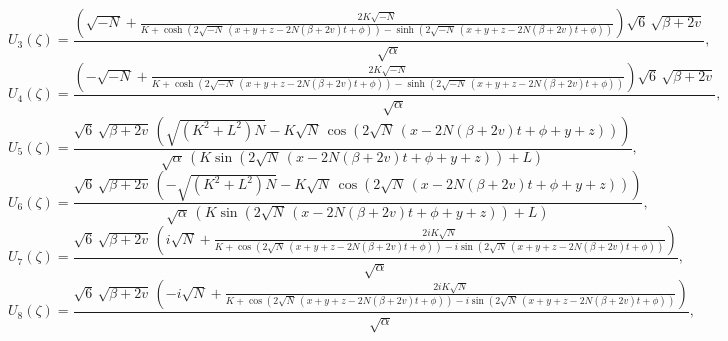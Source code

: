 \documentclass{article}
\numberwithin{equation}{section}
\begin{document}
\begin{equation}\label{U3}
    U_{3}\! \left(\zeta \right) =
\frac{\left(\sqrt{-N}+\frac{2 K \sqrt{-N}}{K +\cosh \left(2 \sqrt{-N}\, \left(x + y + z  -2 N \left(\beta +2 v \right) t +\phi \right)\right)-\sinh \left(2 \sqrt{-N}\, \left(x + y + z  -2 N \left(\beta +2 v \right) t +\phi \right)\right)}\right) \sqrt{6}\, \sqrt{\beta +2 v}}{\sqrt{\alpha}},
\end{equation}
\begin{equation}\label{U4}
    U_{4}\! \left(\zeta \right) =
\frac{\left(-\sqrt{-N}+\frac{2 K \sqrt{-N}}{K +\cosh \left(2 \sqrt{-N}\, \left(x + y + z  -2 N \left(\beta +2 v \right) t +\phi \right)\right)-\sinh \left(2 \sqrt{-N}\, \left(x + y + z  -2 N \left(\beta +2 v \right) t +\phi \right)\right)}\right) \sqrt{6}\, \sqrt{\beta +2 v}}{\sqrt{\alpha}},
\end{equation}
\begin{equation}\label{U5}
    U_{5} \! \left(\zeta \right) =
\frac{\sqrt{6}\, \sqrt{\beta +2 v}\, \left(\sqrt{\left(K^{2}+L^{2}\right) N}-K \sqrt{N}\, \cos \! \left(2 \sqrt{N}\, \left(x -2 N \left(\beta +2 v \right) t +\phi +y +z \right)\right)\right)}{\sqrt{\alpha}\, \left(K \sin \! \left(2 \sqrt{N}\, \left(x -2 N \left(\beta +2 v \right) t +\phi +y +z \right)\right)+L \right)},
\end{equation}
\begin{equation}\label{U6}
    U_{6} \! \left(\zeta \right) =
\frac{\sqrt{6}\, \sqrt{\beta +2 v}\, \left(-\sqrt{\left(K^{2}+L^{2}\right) N}-K \sqrt{N}\, \cos \! \left(2 \sqrt{N}\, \left(x -2 N \left(\beta +2 v \right) t +\phi +y +z \right)\right)\right)}{\sqrt{\alpha}\, \left(K \sin \! \left(2 \sqrt{N}\, \left(x -2 N \left(\beta +2 v \right) t +\phi +y +z \right)\right)+L \right)},
\end{equation}
\begin{equation}\label{U7}
    U_{7} \! \left(\zeta \right) =
\frac{\sqrt{6}\, \sqrt{\beta +2 v}\, \left(i \sqrt{N}+\frac{2 i K \sqrt{N}}{K +\cos \left(2 \sqrt{N}\, \left(x +y +z -2 N \left(\beta +2 v \right) t +\phi \right)\right)-i \sin \left(2 \sqrt{N}\, \left(x +y +z -2 N \left(\beta +2 v \right) t +\phi \right)\right)}\right)}{\sqrt{\alpha}},
\end{equation}
\begin{equation}\label{U8}
    U_{8} \! \left(\zeta \right) =
\frac{\sqrt{6}\, \sqrt{\beta +2 v}\, \left(-i \sqrt{N}+\frac{2 i K \sqrt{N}}{K +\cos \left(2 \sqrt{N}\, \left(x +y +z -2 N \left(\beta +2 v \right) t +\phi \right)\right)-i \sin \left(2 \sqrt{N}\, \left(x +y +z -2 N \left(\beta +2 v \right) t +\phi \right)\right)}\right)}{\sqrt{\alpha}},
\end{equation}
\end{document}
